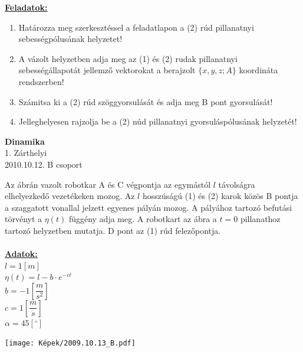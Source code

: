 \documentclass[11pt,a4paper]{article}
\begin{document}
\vspace{2em}
\underline{\textbf{Feladatok:}}
\begin{enumerate}
    \item Határozza meg szerkesztéssel a feladatlapon a (2) rúd pillanatnyi sebességpólusának
    helyzetet!
    \item A vázolt helyzetben adja meg az (1) és (2) rudak pillanatnyi sebességállapotát jellemző
    vektorokat a berajzolt \(\{x,y,z; A\}\) koordináta rendszerben!
    \item Számitsa ki a (2) rúd szöggyorsulását és adja meg B pont gyorsulását!
    \item Jelleghelyesen rajzolja be a (2) núd pillanatnyi gyorsuláspólusának helyzetét!
\end{enumerate}
\newpage

\begin{center}
    \textbf{\LARGE{Dinamika}}\\
    1. Zárthelyi\\
    2010.10.12. B csoport
\end{center}
Az ábrán vazolt robotkar A és C végpontja az egymástól \(l\) távolságra elhelyezkedő vezetékeken mozog. Az \(l\) hosszúságú (1) és (2) karok közös B pontja a szaggatott vonallal jelzett egyenes pályán mozog. A pályához tartozó befutási törvényt a \(\eta(t)\) függény adja meg. A robotkart az ábra a \( t = 0\) pillanathoz tartozó helyzetben mutatja. D pont az (1) rúd felezőpontja.\\\\
\underline{\textbf{Adatok:}}\\
$l = 1 [m]$\\
$\eta(t) = l - b\cdot e^{-ct}$\\
$b = -1 \left[\dfrac{m}{s^2}\right]$\\
$c = 1 \left[\dfrac{m}{s}\right]$\\
$\alpha = 45 [^\circ]$
\begin{center}
    \texttt{[image: Képek/2009.10.13\_B.pdf]}
\end{center}
\end{document}
